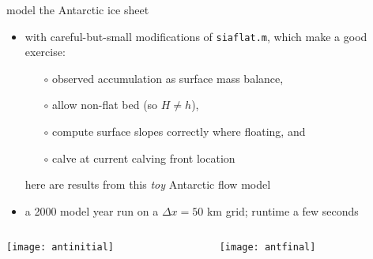 \begin{frame}{model the Antarctic ice sheet}

\normalsize
\begin{itemize}
\item with careful-but-small modifications of \texttt{siaflat.m}, which make a good exercise:
  \begin{itemize}
  \item[$\circ$] observed accumulation as surface mass balance,
  \item[$\circ$] allow non-flat bed (so $H\ne h$),
  \item[$\circ$] compute surface slopes correctly where floating, and
  \item[$\circ$] calve at current calving front location
  \end{itemize}
here are results from this \emph{toy} Antarctic flow model
\item a 2000 model year run on a $\Delta x=50$ km grid; runtime a few seconds
\end{itemize}

\bigskip

\begin{columns}
\begin{column}{0.4\textwidth}
\texttt{[image: antinitial]}
\end{column}
\begin{column}{0.55\textwidth}
\texttt{[image: antfinal]}
\end{column}
\end{columns}
\end{frame}


\begin{comment}
\begin{frame}{final comments on SIA: origin and rigor}

where does the ``shallow ice approximation'' come from?:
\bigskip

\begin{itemize}
\item historically, Fowler and Larson (1978)\nocite{FowlerLarson1978}, Morland and Johnson (1980)\nocite{MorlandJohnson}, and Hutter (1983)\nocite{Hutter} \dots thus recent
\item logically, by a ``small-parameter argument'', based on a small depth-to-width ratio, from the more complete Stokes model for slow ice flow
\item more precisely, by using the small aspect ratio \, $\eps = [H]/[L]$ \, of ice sheets to scale the Stokes model to see which terms make small contributions
\end{itemize}
\end{frame}
\end{comment}